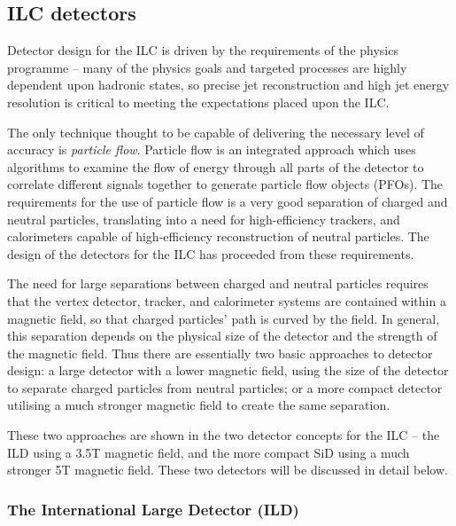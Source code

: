 \subsection{ILC detectors}
Detector design for the \acrshort{ILC} is driven by the requirements of the physics programme -- many of the physics goals and targeted processes are highly dependent upon hadronic states, so precise jet reconstruction and high jet energy resolution is critical to meeting the expectations placed upon the \acrshort{ILC}. 

The only technique thought to be capable of delivering the necessary level of accuracy is \textit{particle flow}. Particle flow is an integrated approach which uses algorithms to examine the flow of energy through all parts of the detector to correlate different signals together to generate particle flow objects (\acrshort{PFO}s). The requirements for the use of particle flow is a very good separation of charged and neutral particles, translating into a need for high-efficiency trackers, and calorimeters capable of high-efficiency reconstruction of neutral particles. The design of the detectors for the \acrshort{ILC} has proceeded from these requirements.

The need for large separations between charged and neutral particles requires that the vertex detector, tracker, and calorimeter systems are contained within a magnetic field, so that charged particles' path is curved by the field. In general, this separation depends on the physical size of the detector and the strength of the magnetic field. Thus there are essentially two basic approaches to detector design: a large detector with a lower magnetic field, using the size of the detector to separate charged particles from neutral particles; or a more compact detector utilising a much stronger magnetic field to create the same separation.

These two approaches are shown in the two detector concepts for the \acrshort{ILC} -- the \acrlong{ILD} using a 3.5T magnetic field, and the more compact \acrlong{SiD} using a much stronger 5T magnetic field. These two detectors will be discussed in detail below.

\subsubsection{The International Large Detector (ILD)}

